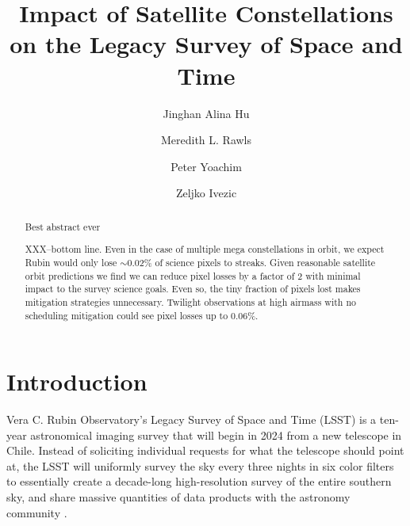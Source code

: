 \documentclass[linenumbers]{aastex631}
\begin{document}
\title{Impact of Satellite Constellations on the Legacy Survey of Space and Time}

\author[0000-0002-8400-1910]{Jinghan Alina Hu}
\author[0000-0003-1305-7308]{Meredith L. Rawls}
\author[0000-0003-2874-6464]{Peter Yoachim}
\author{Zeljko Ivezic}

\begin{abstract}
Best abstract ever

XXX--bottom line. Even in the case of multiple mega constellations in orbit, we expect Rubin would only lose $\sim$0.02\% of science pixels to streaks. Given reasonable satellite orbit predictions we find we can reduce pixel losses by a factor of 2 with minimal impact to the survey science goals. Even so, the tiny fraction of pixels lost makes mitigation strategies unnecessary. Twilight observations at high airmass with no scheduling mitigation could see pixel losses up to 0.06\%. 
\end{abstract}


\section{Introduction} \label{sec:intro}

Vera C. Rubin Observatory's Legacy Survey of Space and Time (LSST) is a ten-year astronomical imaging survey that will begin in 2024 from a new telescope in Chile. Instead of soliciting individual requests for what the telescope should point at, the LSST will uniformly survey the sky every three nights in six color filters to essentially create a decade-long high-resolution survey of the entire southern sky, and share massive quantities of data products with the astronomy community \citep{overview}.
\end{document}
